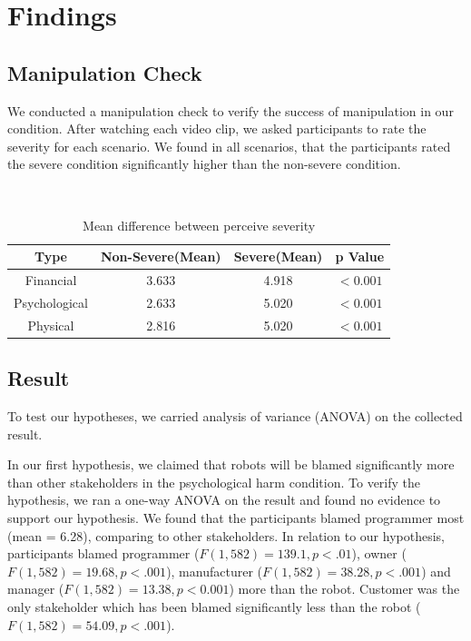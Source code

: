\documentclass{sigchi}
\begin{document}
\section{Findings}
\subsection{Manipulation Check}
We conducted a manipulation check to verify the success of manipulation in our condition. After watching each video clip, we asked participants to rate the severity for each scenario. We found in all scenarios, that the participants rated the severe condition significantly higher than the non-severe condition.

\hspace{1 mm} \\
\begin{table}
  \centering
  \begin{tabular}{cccc}
    Type & Non-Severe(Mean) & Severe(Mean) & p Value \\
    \hline
    Financial & 3.633 & 4.918 & $ < 0.001$ \\
    Psychological & 2.633 & 5.020 & $ < 0.001$ \\
    Physical & 2.816 & 5.020 & $ < 0.001$ \\
    \hline
  \end{tabular}
  \caption{Mean difference between perceive severity}
  \label{tab:table1}
\end{table}

\subsection{Result}
To test our hypotheses, we carried analysis of variance (ANOVA) on the collected result. 

In our first hypothesis, we claimed that robots will be blamed significantly more than other stakeholders in the psychological harm condition. To verify the hypothesis, we ran a one-way ANOVA on the result and found no evidence to support our hypothesis. We found that the participants blamed programmer most (mean = 6.28), comparing to other stakeholders. In relation to our hypothesis, participants blamed programmer ($ F(1,582) =139.1, p < .01$), owner ($ F(1,582) = 19.68, p < .001$), manufacturer ($F(1,582) = 38.28, p < .001$) and manager ($F(1,582) = 13.38, p < 0.001$) more than the robot. Customer was the only stakeholder which has been blamed significantly less than the robot ($F(1,582) = 54.09, p < .001$).
\end{document}
